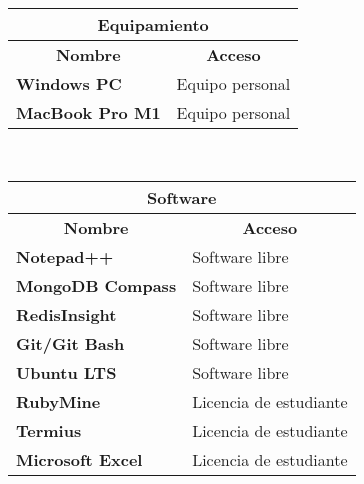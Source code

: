\begin{center}
	\begin{tabular}{ | l | p{10cm} |}
		\hline
		\multicolumn{2}{|c|}{\textbf{Equipamiento}} \\
		\hline
		\multicolumn{1}{|c|}{\textbf{Nombre}} & \multicolumn{1}{|c|}{\textbf{Acceso}} \\
		\hline
		{\textbf{Windows PC}} & Equipo personal \\ \hline
		
		{\textbf{MacBook Pro M1}} & Equipo personal \\ \hline
	\end{tabular}
  \\
  \label{table:physical-equipment}
\end{center}

\begin{center}
	\begin{tabular}{ | l | p{10cm} |}
		\hline
		\multicolumn{2}{|c|}{\textbf{Software}} \\
		\hline
		\multicolumn{1}{|c|}{\textbf{Nombre}} & \multicolumn{1}{|c|}{\textbf{Acceso}} \\
		\hline
		
		{\textbf{Notepad++}} & Software libre \\ \hline
		
		{\textbf{MongoDB Compass}} & Software libre \\ \hline
		
		{\textbf{RedisInsight}} & Software libre \\ \hline
		
		{\textbf{Git/Git Bash}} & Software libre \\ \hline
		
		{\textbf{Ubuntu LTS}} & Software libre \\ \hline
		
		{\textbf{RubyMine}} & Licencia de estudiante \\ \hline
		
		{\textbf{Termius}} & Licencia de estudiante \\ \hline
		
		{\textbf{Microsoft Excel}} & Licencia de estudiante \\ \hline
	\end{tabular}
  \\
  \label{table:software}
\end{center}

